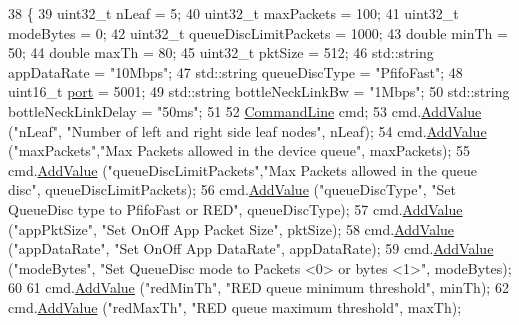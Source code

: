 \begin{DoxyCode}
38 \{
39   uint32\_t    nLeaf = 5; 
40   uint32\_t    maxPackets = 100;
41   uint32\_t    modeBytes  = 0;
42   uint32\_t    queueDiscLimitPackets = 1000;
43   \textcolor{keywordtype}{double}      minTh = 50;
44   \textcolor{keywordtype}{double}      maxTh = 80;
45   uint32\_t    pktSize = 512;
46   std::string appDataRate = \textcolor{stringliteral}{"10Mbps"};
47   std::string queueDiscType = \textcolor{stringliteral}{"PfifoFast"};
48   uint16\_t \hyperlink{dsdv-manet_8cc_a8e0798404bf2cf5dabb84c5ba9a4f236}{port} = 5001;
49   std::string bottleNeckLinkBw = \textcolor{stringliteral}{"1Mbps"};
50   std::string bottleNeckLinkDelay = \textcolor{stringliteral}{"50ms"};
51 
52   \hyperlink{classns3_1_1CommandLine}{CommandLine} cmd;
53   cmd.\hyperlink{classns3_1_1CommandLine_addcfb546c7ad4c8bd0965654d55beb8e}{AddValue} (\textcolor{stringliteral}{"nLeaf"},     \textcolor{stringliteral}{"Number of left and right side leaf nodes"}, nLeaf);
54   cmd.\hyperlink{classns3_1_1CommandLine_addcfb546c7ad4c8bd0965654d55beb8e}{AddValue} (\textcolor{stringliteral}{"maxPackets"},\textcolor{stringliteral}{"Max Packets allowed in the device queue"}, maxPackets);
55   cmd.\hyperlink{classns3_1_1CommandLine_addcfb546c7ad4c8bd0965654d55beb8e}{AddValue} (\textcolor{stringliteral}{"queueDiscLimitPackets"},\textcolor{stringliteral}{"Max Packets allowed in the queue disc"}, 
      queueDiscLimitPackets);
56   cmd.\hyperlink{classns3_1_1CommandLine_addcfb546c7ad4c8bd0965654d55beb8e}{AddValue} (\textcolor{stringliteral}{"queueDiscType"}, \textcolor{stringliteral}{"Set QueueDisc type to PfifoFast or RED"}, queueDiscType);
57   cmd.\hyperlink{classns3_1_1CommandLine_addcfb546c7ad4c8bd0965654d55beb8e}{AddValue} (\textcolor{stringliteral}{"appPktSize"}, \textcolor{stringliteral}{"Set OnOff App Packet Size"}, pktSize);
58   cmd.\hyperlink{classns3_1_1CommandLine_addcfb546c7ad4c8bd0965654d55beb8e}{AddValue} (\textcolor{stringliteral}{"appDataRate"}, \textcolor{stringliteral}{"Set OnOff App DataRate"}, appDataRate);
59   cmd.\hyperlink{classns3_1_1CommandLine_addcfb546c7ad4c8bd0965654d55beb8e}{AddValue} (\textcolor{stringliteral}{"modeBytes"}, \textcolor{stringliteral}{"Set QueueDisc mode to Packets <0> or bytes <1>"}, modeBytes);
60 
61   cmd.\hyperlink{classns3_1_1CommandLine_addcfb546c7ad4c8bd0965654d55beb8e}{AddValue} (\textcolor{stringliteral}{"redMinTh"}, \textcolor{stringliteral}{"RED queue minimum threshold"}, minTh);
62   cmd.\hyperlink{classns3_1_1CommandLine_addcfb546c7ad4c8bd0965654d55beb8e}{AddValue} (\textcolor{stringliteral}{"redMaxTh"}, \textcolor{stringliteral}{"RED queue maximum threshold"}, maxTh);

\end{DoxyCode}
